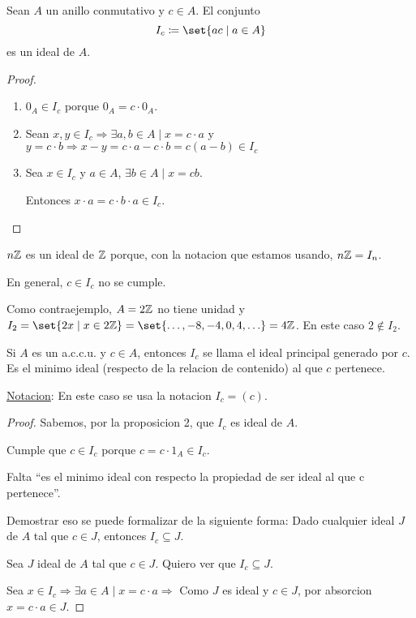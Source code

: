 \begin{proposition}
	Sean \(A \) un anillo conmutativo y \(c \in A \). El conjunto
	\[
		I_c \coloneqq \set{ac \mid a \in A }
	\]
	es un ideal de \(A \).
\end{proposition}
\begin{proof}

	\begin{enumerate}
		\item \(0_A \in I_c \) porque \(0_A = c \cdot 0_A \).
		\item Sean \(x,y \in I_c \Rightarrow\exists a,b \in A \mid x = c \cdot a \) y \(y = c \cdot b \Rightarrow x - y = c \cdot a - c \cdot b = c (a - b) \in I_c \)
		\item Sea \(x \in I_c \) y \(a \in A \), \(\exists  b \in A \mid x = cb \).
		      
		      Entonces \(x \cdot a = c \cdot b \cdot a \in I_c \).
	\end{enumerate}
\end{proof}
\begin{remark}
	\(n\mathbb{Z} \) es un ideal de \(\mathbb{Z} \) porque, con la notacion que estamos usando, \(n\mathbb{Z} = I_n \).
\end{remark}
\begin{remark}
	En general, \(c \in I_c\) no se cumple.
	
	Como contraejemplo, \(A = 2\mathbb{Z} \) no tiene unidad y \(I_2 = \set{2x \mid x \in 2\Z } = \set{\ldots,-8,-4,0,4,\ldots } = 4\Z \). En este caso \(2 \not\in I_2 \).
\end{remark}
\begin{proposition}
	Si \(A \) es un a.c.c.u. y \(c \in A \), entonces \(I_c\) se llama el ideal principal generado por \(c \). Es el minimo ideal (respecto de la relacion de contenido) al que \(c \) pertenece.
	
	\underline{Notacion}: En este caso se usa la notacion \(I_c = (c )\).
\end{proposition}
\begin{proof}
	Sabemos, por la proposicion 2, que \(I_c \) es ideal de \(A \).
	
	Cumple que \(c \in I_c \) porque \(c = c \cdot 1_A \in I_c\).
	
	Falta ``es el minimo ideal con respecto la propiedad de ser ideal al que c pertenece''.
	
	Demostrar eso se puede formalizar de la siguiente forma: Dado cualquier ideal \(J \) de \(A \) tal que \(c \in J \), entonces \(I_c \subseteq J \).
	
	Sea \(J \) ideal de \(A \) tal que \(c \in J \). Quiero ver que \(I_c \subseteq J\).
	
	Sea \(x \in I_c \Rightarrow \exists a \in A \mid x = c \cdot a \Rightarrow \) Como \(J \) es ideal y \(c \in J \), por absorcion \(x = c \cdot a \in J\).
\end{proof}

